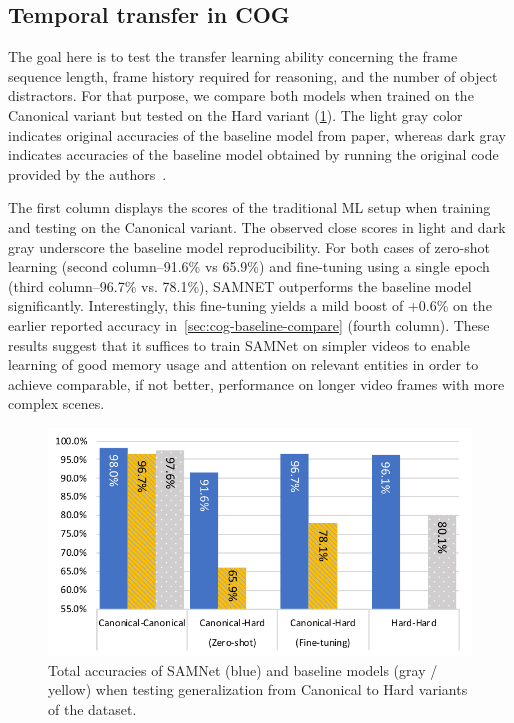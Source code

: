 \newpage
\subsection{Temporal transfer in COG}
\label{sec:temporal}

The goal here is to test the transfer learning ability concerning the frame sequence length, frame history required
for reasoning, and the number of object distractors.
For that purpose, we compare both models when trained on the Canonical variant but tested on the
Hard variant (\cref{fig:samnet_cog_overall_transfer}).
The light gray color indicates original accuracies of the baseline model from paper,
whereas dark gray indicates accuracies of the baseline model
obtained by running the original code provided by the authors~\cite{yang2018implement}.

The first column displays the scores of the traditional ML setup when training and testing on the Canonical variant.
The observed close scores in light and dark gray underscore the baseline model reproducibility.
For both cases of zero-shot learning (second column--91.6\% vs 65.9\%) and fine-tuning using a single epoch
(third column--96.7\% vs. 78.1\%), SAMNET outperforms the baseline model significantly.
Interestingly, this fine-tuning yields a mild boost of +0.6\% on the earlier reported accuracy
in~\cref{sec:cog-baseline-compare} (fourth column).
These results suggest that it suffices to train SAMNet on simpler videos
to enable learning of good memory usage and attention on relevant entities
in order to achieve comparable, if not better,
performance on longer video frames with more complex scenes.

\begin{figure}[htbp]
	\centering
	\includegraphics[width=\columnwidth]{../results/samnet_cog_overall_transfer_new.pdf}
	\caption{Total accuracies of SAMNet (blue) and baseline models (gray / yellow) when testing generalization from Canonical to Hard variants of the dataset.}
	\label{fig:samnet_cog_overall_transfer}
\end{figure}


